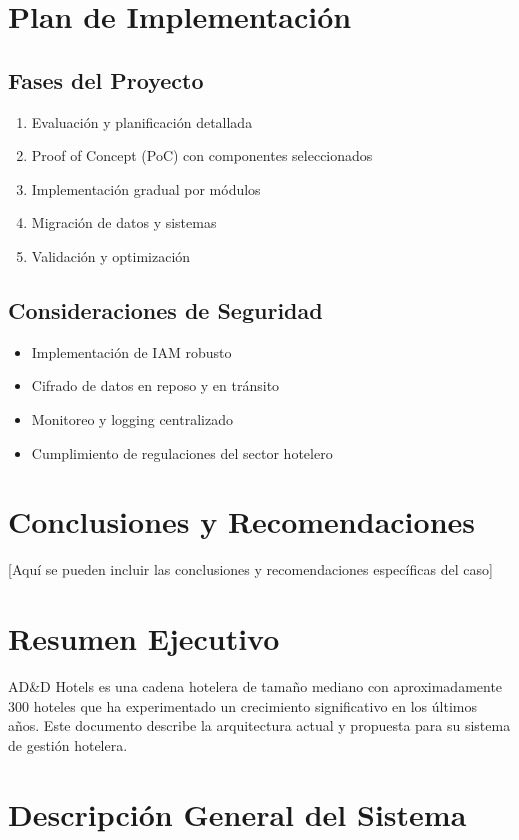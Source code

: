 \section{Plan de Implementación}
\subsection{Fases del Proyecto}
\begin{enumerate}
    \item Evaluación y planificación detallada
    \item Proof of Concept (PoC) con componentes seleccionados
    \item Implementación gradual por módulos
    \item Migración de datos y sistemas
    \item Validación y optimización
\end{enumerate}

\subsection{Consideraciones de Seguridad}
\begin{itemize}
    \item Implementación de IAM robusto
    \item Cifrado de datos en reposo y en tránsito
    \item Monitoreo y logging centralizado
    \item Cumplimiento de regulaciones del sector hotelero
\end{itemize}

\section{Conclusiones y Recomendaciones}
[Aquí se pueden incluir las conclusiones y recomendaciones específicas del caso]

\section{Resumen Ejecutivo}
AD\&D Hotels es una cadena hotelera de tamaño mediano con aproximadamente 300 hoteles que ha experimentado un crecimiento significativo en los últimos años. Este documento describe la arquitectura actual y propuesta para su sistema de gestión hotelera.

\section{Descripción General del Sistema}
